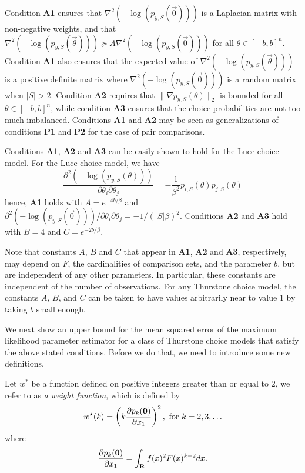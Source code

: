 Condition {\bf A1} ensures that $\nabla^2(-\log(p_{y,S}(\vec{0})))$ is a Laplacian matrix with non-negative weights, and that $\nabla^2(-\log(p_{y,S}(\vec{\theta})))\succeq A \nabla^2(-\log(p_{y,S}(\vec{0})))$ for all $\theta\in [-b,b]^n$. Condition {\bf A1} also ensures that the expected value of $\nabla^2 (-\log(p_{y,S}(\vec{\theta})))$ is a positive definite matrix where $\nabla^2(-\log(p_{y,S}(\vec{0})))$ is a random matrix when $|S| >2$. Condition {\bf A2} requires that $\|\nabla p_{y,S}(\theta)\|_2$ is bounded for all $\theta \in [-b,b]^n$, while condition {\bf A3} ensures that the choice probabilities are not too much imbalanced. Conditions {\bf A1} and {\bf A2} may be seen as generalizations of conditions {\bf P1} and {\bf P2} for the case of pair comparisons.

Conditions {\bf A1}, {\bf A2} and {\bf A3} can be easily shown to hold for the Luce choice model. For the Luce choice model, we have   
$$
\frac{\partial^2(-\log(p_{y,S}(\theta)))}{\partial \theta_i \partial \theta_j} = -\frac{1}{\beta^2}p_{i,S}(\theta)p_{j,S}(\theta)
$$
hence, {\bf A1} holds with $A = e^{-4b/\beta}$ and $\partial^2(-\log(p_{y,S}(\vec{0})))/\partial \theta_i \partial \theta_j = -1/(|S|\beta)^2$. Conditions {\bf A2} and {\bf A3} hold with $B = 4$ and $C = e^{-2b/\beta}$. 

Note that constants $A$, $B$ and $C$ that appear in {\bf A1}, {\bf A2} and {\bf A3}, respectively, may depend on $F$, the cardinalities of comparison sets, and the parameter $b$, but are independent of any other parameters. In particular, these constants are independent of the number of observations. For any Thurstone choice model, the constants $A$, $B$, and $C$ can be taken to have values arbitrarily near to value $1$ by taking $b$ small enough. 

We next show an upper bound for the mean squared error of the maximum likelihood parameter estimator for a class of Thurstone choice models that satisfy the above stated conditions. Before we do that, we need to introduce some new definitions. 

\begin{definition} Let $w^*$ be a function defined on positive integers greater than or equal to $2$, we refer to as \emph{a weight function}, which is defined by
\begin{equation}
w^\star(k) = \left(k\frac{\partial p_k(\vec{0})}{\partial x_1}\right)^2, \hbox{ for } k = 2,3,\ldots
\label{equ:theweight}
\end{equation}
where
\begin{equation}
\frac{\partial p_k(\vec{0})}{\partial x_1} = \int_\reals f(x)^2 F(x)^{k-2}dx.
\label{equ:partp}
\end{equation}
\end{definition}

